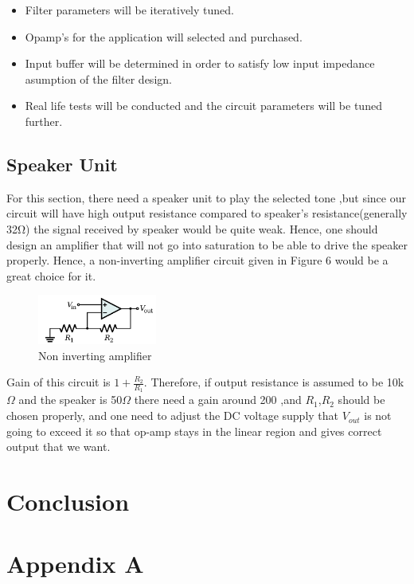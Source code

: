 \documentclass[letterpaper,12pt]{article}
\begin{document}
\begin{itemize}
    \item Filter parameters will be iteratively tuned.
    \item Opamp's for the application will selected and purchased.
    \item Input buffer will be determined in order to satisfy low input impedance asumption of the filter design.
    \item Real life tests will be conducted and the circuit parameters will be tuned further.
\end{itemize}
\subsection{Speaker Unit}
For this section, there need a speaker unit to play the selected tone ,but since our circuit will have high output resistance compared to speaker's resistance(generally 32Ω) the signal received by speaker would be quite weak. Hence, one should design an amplifier that will not go into saturation to be able to drive the speaker properly. Hence, a non-inverting amplifier circuit given in Figure 6 would be a great choice for it. 
\begin{figure}[H]
    \centering
    \includegraphics[width = 0.35\textwidth]{Non-Inverting_Amplifier.svg.png}
    \caption{Non inverting amplifier}
\end{figure} 
Gain of this circuit is \(1 + \frac{R_2}{R_1}\). Therefore, if output resistance is assumed to be 10k\(\Omega\) and the speaker is 50\(\Omega\) there need a gain around 200 ,and \(R_1\),\(R_2\) should be chosen properly, and one need to adjust the DC voltage supply that \(V_{out}\) is not going to exceed it so that op-amp stays in the linear region and gives correct output that we want. 

\section{Conclusion}
\section*{Appendix A}
\end{document}
